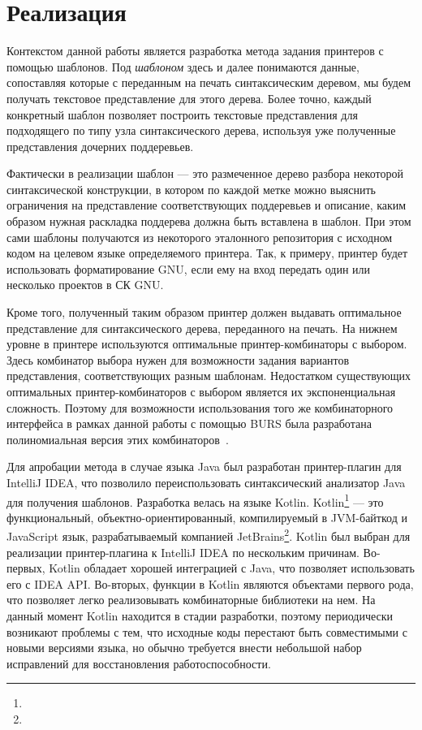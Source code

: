 \section{Реализация}

Контекстом данной работы является разработка метода задания принтеров с помощью шаблонов.
Под \emph{шаблоном} здесь и далее понимаются данные, сопоставляя которые с
переданным на печать синтаксическим деревом, мы будем получать текстовое представление
для этого дерева. Более точно, каждый конкретный шаблон позволяет построить
текстовые представления для подходящего по типу 
узла синтаксического дерева, используя уже полученные представления дочерних поддеревьев.

Фактически в реализации шаблон --- это размеченное дерево разбора
некоторой синтаксической конструкции, в котором по каждой метке можно выяснить
ограничения на представление соответствующих поддеревьев и описание, каким
образом нужная раскладка поддерева должна быть вставлена в шаблон.
При этом сами шаблоны получаются из некоторого эталонного репозитория с исходном
кодом на целевом языке определяемого принтера.
Так, к примеру, принтер будет использовать форматирование GNU, если ему на вход
передать один или несколько проектов в СК GNU.

Кроме того, полученный таким образом принтер должен выдавать оптимальное представление
для синтаксического дерева, переданного на печать. На нижнем уровне в принтере 
используются оптимальные принтер-комбинаторы с выбором. Здесь комбинатор выбора нужен
для возможности задания вариантов представления, соответствующих разным шаблонам.
Недостатком существующих оптимальных принтер-комбинаторов с выбором \cite{swierstra}
является их экспоненциальная сложность. Поэтому для возможности использования того же
комбинаторного интерфейса в рамках данной работы с помощью BURS была разработана
полиномиальная версия этих комбинаторов~\cite{podkopaevBoulytchev}.

Для апробации метода в случае языка Java был разработан принтер-плагин для
IntelliJ IDEA, что позволило переиспользовать синтаксический анализатор Java
для получения шаблонов.
Разработка велась на языке Kotlin.
Kotlin\footnote{}
--- это функциональный, объектно-ориентированный, компилируемый
в JVM-байткод и JavaScript язык, разрабатываемый компанией
JetBrains\footnote{}.
Kotlin был выбран для реализации принтер-плагина к IntelliJ IDEA по нескольким
причинам. 
Во-первых, Kotlin обладает хорошей интеграцией с Java, что позволяет
использовать его с IDEA API. 
Во-вторых, функции в Kotlin являются объектами первого рода, что позволяет
легко реализовывать комбинаторные библиотеки на нем.
На данный момент Kotlin находится в стадии разработки, поэтому
периодически возникают
проблемы с тем, что исходные коды перестают быть совместимыми с новыми
версиями языка,
но обычно требуется внести небольшой набор исправлений для
восстановления работоспособности.

